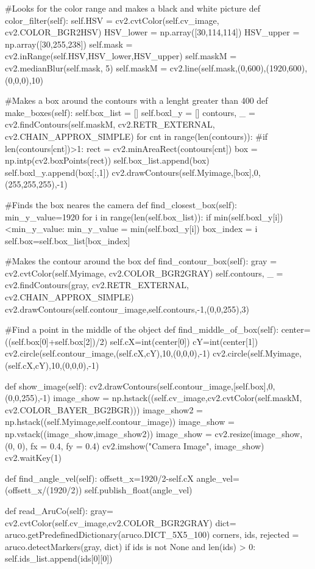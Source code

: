     

   #Looks for the color range and makes a black and white picture 
    def color_filter(self):  
        self.HSV = cv2.cvtColor(self.cv_image, cv2.COLOR_BGR2HSV)
        HSV_lower = np.array([30,114,114])
        HSV_upper = np.array([30,255,238])
        self.mask = cv2.inRange(self.HSV,HSV_lower,HSV_upper)
        self.maskM = cv2.medianBlur(self.mask, 5)
        self.maskM = cv2.line(self.mask,(0,600),(1920,600),(0,0,0),10)

    
    #Makes a box around the contours with a lenght greater than 400
    def make_boxes(self):
        self.box_list = []
        self.boxl_y = []
        contours, _ = cv2.findContours(self.maskM, cv2.RETR_EXTERNAL, cv2.CHAIN_APPROX_SIMPLE)
        for cnt in range(len(contours)):
            #if len(contours[cnt])>1:
                rect = cv2.minAreaRect(contours[cnt])
                box = np.intp(cv2.boxPoints(rect))
                self.box_list.append(box)
                self.boxl_y.append(box[:,1])
                cv2.drawContours(self.Myimage,[box],0,(255,255,255),-1)

#Finds the box neares the camera 
    def find_closest_box(self):
        min_y_value=1920
        for i in range(len(self.box_list)):
            if min(self.boxl_y[i])<min_y_value: 
                min_y_value = min(self.boxl_y[i])
                box_index = i 
        self.box=self.box_list[box_index]

#Makes the contour around the box
    def find_contour_box(self):
        gray = cv2.cvtColor(self.Myimage, cv2.COLOR_BGR2GRAY)
        self.contours, _ = cv2.findContours(gray, cv2.RETR_EXTERNAL, cv2.CHAIN_APPROX_SIMPLE)
        cv2.drawContours(self.contour_image,self.contours,-1,(0,0,255),3)

#Find a point in the middle of the object
    def find_middle_of_box(self):    
        center=((self.box[0]+self.box[2])/2)
        self.cX=int(center[0])
        cY=int(center[1])
        cv2.circle(self.contour_image,(self.cX,cY),10,(0,0,0),-1)
        cv2.circle(self.Myimage,(self.cX,cY),10,(0,0,0),-1)


    def show_image(self):
        cv2.drawContours(self.contour_image,[self.box],0,(0,0,255),-1)
        image_show = np.hstack((self.cv_image,cv2.cvtColor(self.maskM, cv2.COLOR_BAYER_BG2BGR)))
        image_show2 = np.hstack((self.Myimage,self.contour_image))
        image_show = np.vstack((image_show,image_show2))
        image_show = cv2.resize(image_show, (0, 0), fx = 0.4, fy = 0.4)
        cv2.imshow("Camera Image", image_show)
        cv2.waitKey(1)


    def find_angle_vel(self):
        offsett_x=1920/2-self.cX
        angle_vel=(offsett_x/(1920/2))
        self.publish_float(angle_vel)

    
    def read_AruCo(self):
        gray= cv2.cvtColor(self.cv_image,cv2.COLOR_BGR2GRAY)
        dict= aruco.getPredefinedDictionary(aruco.DICT_5X5_100)
        corners, ids, rejected = aruco.detectMarkers(gray, dict)
        if ids is not None and len(ids) > 0:
           self.ids_list.append(ids[0][0])